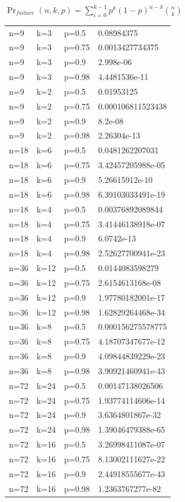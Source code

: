 \documentclass[a4paper,10pt]{article}
\begin{document}
\vspace{2cm}
{\centering
$\Pr_{failure}(n,k,p) = \displaystyle \sum_{i=0}^{k-1} p^{k}(1-p)^{n-k }{n \choose k}$
\\}
\vspace{3cm}
\begin{table}[hbt!]
\begin{center}
\begin{tabular}{llll}
n=9&  k=3&  p=0.5  & 0.08984375 \\
n=9&  k=3&  p=0.75 & 0.0013427734375\\
n=9&  k=3&  p=0.9  & 2.998e-06\\
n=9&  k=3&  p=0.98 & 4.4481536e-11\\
n=9&  k=2&  p=0.5  & 0.01953125\\
n=9&  k=2&  p=0.75 & 0.000106811523438\\
n=9&  k=2&  p=0.9  & 8.2e-08\\
n=9&  k=2&  p=0.98 & 2.26304e-13\\
n=18& k=6&  p=0.5  & 0.0481262207031\\
n=18& k=6&  p=0.75 & 3.42457205988e-05\\
n=18& k=6&  p=0.9  & 5.26615912e-10\\
n=18& k=6&  p=0.98 & 6.39103033491e-19\\
n=18& k=4&  p=0.5  & 0.00376892089844\\
n=18& k=4&  p=0.75 & 3.41446138918e-07\\
n=18& k=4&  p=0.9  & 6.0742e-13\\
n=18& k=4&  p=0.98 & 2.52627700941e-23\\
n=36& k=12& p=0.5  & 0.0144083598279\\
n=36& k=12& p=0.75 & 2.6154613168e-08\\
n=36& k=12& p=0.9  & 1.97780182001e-17\\
n=36& k=12& p=0.98 & 1.62829264468e-34\\
n=36& k=8&  p=0.5  & 0.000156275578775\\
n=36& k=8&  p=0.75 & 4.18707347677e-12\\
n=36& k=8&  p=0.9  & 4.09844839229e-23\\
n=36& k=8&  p=0.98 & 3.90921460941e-43\\
n=72& k=24& p=0.5  & 0.00147138026506\\
n=72& k=24& p=0.75 & 1.93774114606e-14\\
n=72& k=24& p=0.9  & 3.6364801867e-32\\
n=72& k=24& p=0.98 & 1.39046479388e-65\\
n=72& k=16& p=0.5  & 3.26998411087e-07\\
n=72& k=16& p=0.75 & 8.13002111627e-22\\
n=72& k=16& p=0.9  & 2.44918555677e-43\\
n=72& k=16& p=0.98 & 1.2363767277e-82\\
\end{tabular}
\end{center}
\end{table}
\end{document}

